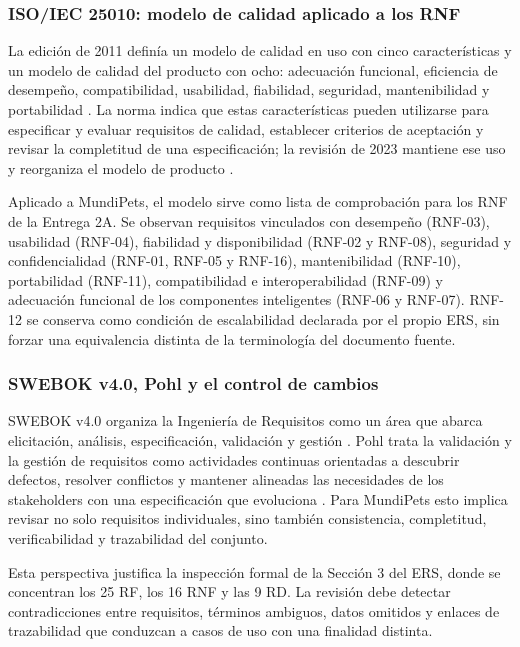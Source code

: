 \documentclass[journal,onecolumn]{IEEEtran}
\begin{document}
	\subsubsection{ISO/IEC 25010: modelo de calidad aplicado a los RNF}
	
	La edición de 2011 definía un modelo de calidad en uso con cinco características y un modelo de
	calidad del producto con ocho: adecuación funcional, eficiencia de desempeño, compatibilidad,
	usabilidad, fiabilidad, seguridad, mantenibilidad y portabilidad \cite{iso25010v2011}. La norma
	indica que estas características pueden utilizarse para especificar y evaluar requisitos de
	calidad, establecer criterios de aceptación y revisar la completitud de una especificación; la
	revisión de 2023 mantiene ese uso y reorganiza el modelo de producto \cite{iso25010}.
	
	Aplicado a MundiPets, el modelo sirve como lista de comprobación para los RNF de la Entrega 2A. Se
	observan requisitos vinculados con desempeño (RNF-03), usabilidad (RNF-04), fiabilidad y
	disponibilidad (RNF-02 y RNF-08), seguridad y confidencialidad (RNF-01, RNF-05 y RNF-16),
	mantenibilidad (RNF-10), portabilidad (RNF-11), compatibilidad e interoperabilidad (RNF-09) y
	adecuación funcional de los componentes inteligentes (RNF-06 y RNF-07). RNF-12 se conserva como
	condición de escalabilidad declarada por el propio ERS, sin forzar una equivalencia distinta de la
	terminología del documento fuente.
	
	\subsubsection{SWEBOK v4.0, Pohl y el control de cambios}
	
	SWEBOK v4.0 organiza la Ingeniería de Requisitos como un área que abarca elicitación, análisis,
	especificación, validación y gestión \cite{swebok4}. Pohl trata la validación y la gestión de
	requisitos como actividades continuas orientadas a descubrir defectos, resolver conflictos y
	mantener alineadas las necesidades de los stakeholders con una especificación que evoluciona
	\cite{pohl2025}. Para MundiPets esto implica revisar no solo requisitos individuales, sino también
	consistencia, completitud, verificabilidad y trazabilidad del conjunto.
	
	Esta perspectiva justifica la inspección formal de la Sección 3 del ERS, donde se concentran los
	25 RF, los 16 RNF y las 9 RD. La revisión debe detectar contradicciones entre requisitos, términos
	ambiguos, datos omitidos y enlaces de trazabilidad que conduzcan a casos de uso con una finalidad
	distinta.
	
\end{document}
